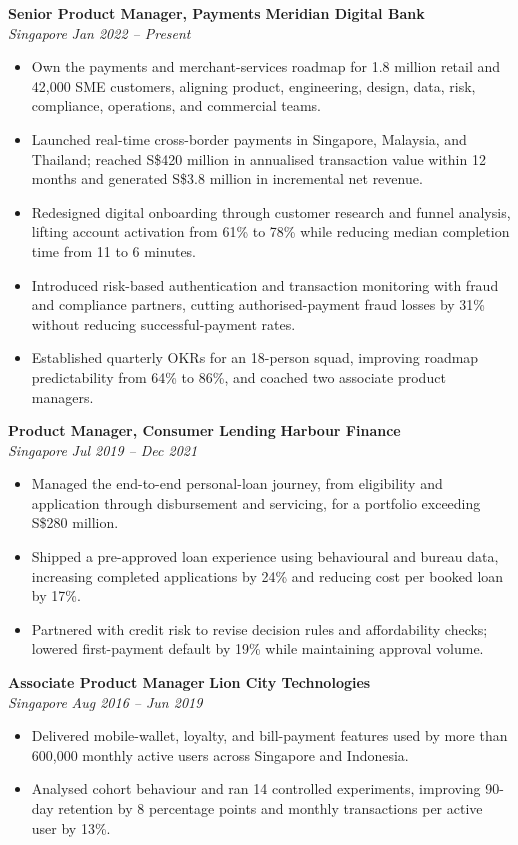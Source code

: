 \documentclass[9pt,a4paper]{extarticle}
\newcommand{\role}[4]{%
  \textbf{#1} \hfill \textbf{#2}\\[-1pt]
  \textit{#3} \hfill \textit{#4}\par
}
\begin{document}
\role{Senior Product Manager, Payments}{Meridian Digital Bank}{Singapore}{Jan 2022 -- Present}
\begin{itemize}
  \item Own the payments and merchant-services roadmap for 1.8 million retail and 42,000 SME customers, aligning product, engineering, design, data, risk, compliance, operations, and commercial teams.
  \item Launched real-time cross-border payments in Singapore, Malaysia, and Thailand; reached S\$420 million in annualised transaction value within 12 months and generated S\$3.8 million in incremental net revenue.
  \item Redesigned digital onboarding through customer research and funnel analysis, lifting account activation from 61\% to 78\% while reducing median completion time from 11 to 6 minutes.
  \item Introduced risk-based authentication and transaction monitoring with fraud and compliance partners, cutting authorised-payment fraud losses by 31\% without reducing successful-payment rates.
  \item Established quarterly OKRs for an 18-person squad, improving roadmap predictability from 64\% to 86\%, and coached two associate product managers.
\end{itemize}

\vspace{1pt}
\role{Product Manager, Consumer Lending}{Harbour Finance}{Singapore}{Jul 2019 -- Dec 2021}
\begin{itemize}
  \item Managed the end-to-end personal-loan journey, from eligibility and application through disbursement and servicing, for a portfolio exceeding S\$280 million.
  \item Shipped a pre-approved loan experience using behavioural and bureau data, increasing completed applications by 24\% and reducing cost per booked loan by 17\%.
  \item Partnered with credit risk to revise decision rules and affordability checks; lowered first-payment default by 19\% while maintaining approval volume.
\end{itemize}

\vspace{1pt}
\role{Associate Product Manager}{Lion City Technologies}{Singapore}{Aug 2016 -- Jun 2019}
\begin{itemize}
  \item Delivered mobile-wallet, loyalty, and bill-payment features used by more than 600,000 monthly active users across Singapore and Indonesia.
  \item Analysed cohort behaviour and ran 14 controlled experiments, improving 90-day retention by 8 percentage points and monthly transactions per active user by 13\%.
\end{itemize}
\end{document}
